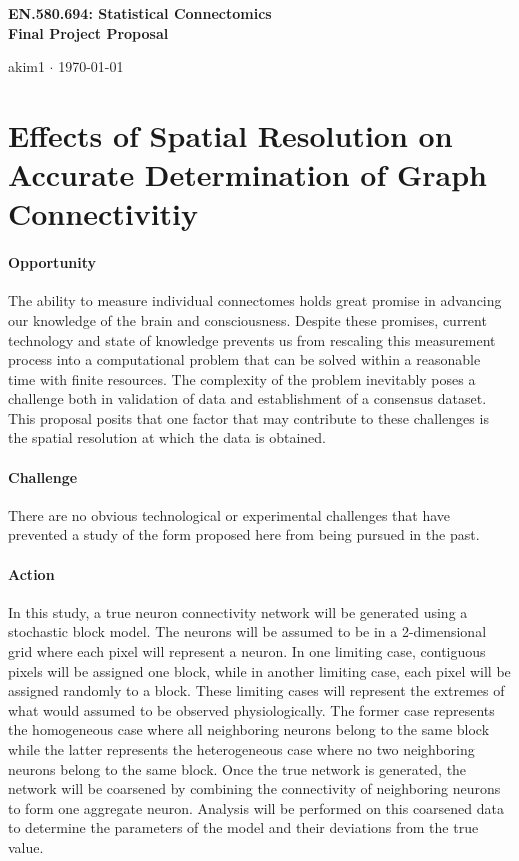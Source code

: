 \documentclass[12pt]{article}
\begin{document}
\begin{center}\Large \bf EN.580.694: Statistical Connectomics \\ Final Project Proposal \end{center}
\begin{center} akim1 $\cdot$  \today \end{center}
\bigskip

\section*{Effects of Spatial Resolution on Accurate Determination of Graph Connectivitiy}

\paragraph{Opportunity}
The ability to measure individual connectomes holds great promise in advancing
our knowledge of the brain and consciousness. Despite these promises, current
technology and state of knowledge prevents us from rescaling this measurement
process into a computational problem that can be solved within a reasonable
time with finite resources. The complexity of the problem inevitably poses a
challenge both in validation of data and establishment of a consensus dataset.
This proposal posits that one factor that may contribute to these challenges is
the spatial resolution at which the data is obtained.

\paragraph{Challenge}
There are no obvious technological or experimental challenges that have
prevented a study of the form proposed here from being pursued in the past.

\paragraph{Action}
In this study, a true neuron connectivity network will be generated using a
stochastic block model. The neurons will be assumed to be in a 2-dimensional
grid where each pixel will represent a neuron. In one limiting case, contiguous
pixels will be assigned one block, while in another limiting case, each pixel
will be assigned randomly to a block. These limiting cases will represent the
extremes of what would assumed to be observed physiologically. The former case
represents the homogeneous case where all neighboring neurons belong to the same
block while the latter represents the heterogeneous case where no two
neighboring neurons belong to the same block. Once the true network is
generated, the network will be coarsened by combining the connectivity of
neighboring neurons to form one aggregate neuron. Analysis will be performed on
this coarsened data to determine the parameters of the model and their
deviations from the true value.
\end{document}
